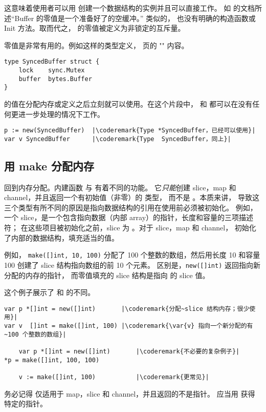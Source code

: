 这意味着使用者可以用  创建一个数据结构的实例并且可以直接工作。
如  的文档所述``Buffer 的零值是一个准备好了的空缓冲。''
类似的， 也没有明确的构造函数或 Init 方法。取而代之，
 的零值被定义为非锁定的互斥量。

零值是非常有用的。例如这样的类型定义，\pageref{sec:defining your own}
页的 "" 内容。

\begin{lstlisting}
type SyncedBuffer struct {
    lock    sync.Mutex
    buffer  bytes.Buffer
}
\end{lstlisting}
 的值在分配内存或定义之后立刻就可以使用。在这个片段中，
 和  都可以在没有任何更进一步处理的情况下工作。
\begin{lstlisting}
p := new(SyncedBuffer)  |\coderemark{Type *SyncedBuffer，已经可以使用}|
var v SyncedBuffer      |\coderemark{Type  SyncedBuffer，同上}|
\end{lstlisting}

\subsection{用 make 分配内存}
\label{sec:allocation with make}
回到内存分配。内建函数  与  有着不同的功能。
它\emph{只能}创建 slice，map 和 channel，并且返回一个有初始值（非零）的  类型，
而不是 。本质来讲，
导致这三个类型有所不同的原因是指向数据结构的引用在使用前必须被初始化。
例如，一个 slice，是一个包含指向数据（内部 array）的指针，长度和容量的三项描述符；
在这些项目被初始化之前，slice 为 。对于 slice，map 和 channel，
 初始化了内部的数据结构，填充适当的值。

例如，
\lstinline{make([]int, 10, 100)}
分配了 100 个整数的数组，然后用长度 10 和容量 100 创建了 slice 
结构指向数组的前 10 个元素。
区别是，\lstinline{new([]int)} 返回指向新分配的内存的指针，
而零值填充的 slice 结构是指向  的 slice 值。

这个例子展示了  和  的不同。
\begin{lstlisting}
var p *[]int = new([]int)       |\coderemark{分配~slice 结构内存；很少使用}|
var v  []int = make([]int, 100) |\coderemark{\var{v} 指向一个新分配的有~100 个整数的数组}|

    var p *[]int = new([]int)       |\coderemark{不必要的复杂例子}|
*p = make([]int, 100, 100)

    v := make([]int, 100)           |\coderemark{更常见}|
\end{lstlisting}
务必记得  仅适用于 map，slice 和 channel，并且返回的不是指针。
应当用  获得特定的指针。

